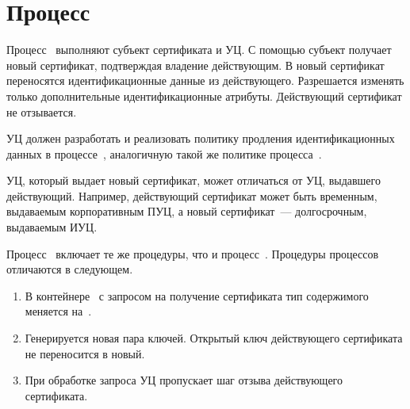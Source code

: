 \section{Процесс }\label{PROCESSES.Spawn}

Процесс~ выполняют субъект сертификата и УЦ. С помощью 
субъект получает новый сертификат, подтверждая владение действующим. В новый
сертификат переносятся   идентификационные данные из действующего. Разрешается
изменять только дополнительные идентификационные атрибуты. Действующий
сертификат не отзывается.

УЦ должен разработать и реализовать политику продления идентификационных данных
в процессе~, аналогичную такой же политике процесса~.

УЦ, который выдает новый сертификат, может отличаться от УЦ, выдавшего
действующий. Например, действующий сертификат может быть временным, выдаваемым
корпоративным ПУЦ, а новый сертификат~--- долгосрочным, выдаваемым ИУЦ.

Процесс~ включает те же процедуры, что и процесс~.
Процедуры процессов отличаются в следующем.

\begin{enumerate}
\item
В контейнере~ с запросом на получение сертификата тип
содержимого меняется на~.
\item
Генерируется новая пара ключей. Открытый ключ действующего сертификата не
переносится в новый.
\item
При обработке запроса УЦ пропускает шаг отзыва действующего сертификата.
\end{enumerate}


